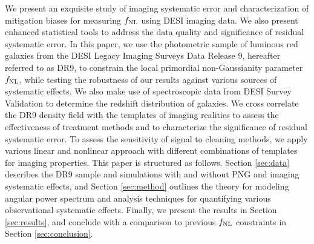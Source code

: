 We present an exquisite study of imaging systematic error and characterization of mitigation biases for measuring $f_{\rm NL}$ using DESI imaging data. We also present enhanced statistical tools to address the data quality and significance of residual systematic error. In this paper, we use the photometric sample of luminous red galaxies from the DESI Legacy Imaging Surveys Data Release 9, hereafter referred to as DR9, to constrain the local primordial non-Gaussianity parameter $f_{\rm NL}$, while testing the robustness of our results against various sources of systematic effects. We also make use of spectroscopic data from DESI Survey Validation to determine the redshift distribution of galaxies. We cross correlate the DR9 density field with the templates of imaging realities to assess the effectiveness of treatment methods and to characterize the significance of residual systematic error. To assess the sensitivity of signal to cleaning methods, we apply various linear and nonlinear approach with different combinations of templates for imaging properties. This paper is structured as follows. Section \ref{sec:data} describes the DR9 sample and simulations with and without PNG and imaging systematic effects, and Section \ref{sec:method} outlines the theory for modeling angular power spectrum and analysis techniques for quantifying various observational systematic effects. Finally, we present the results in Section \ref{sec:results}, and conclude with a comparison to previous $f_{\rm NL}$ constraints in Section \ref{sec:conclusion}.